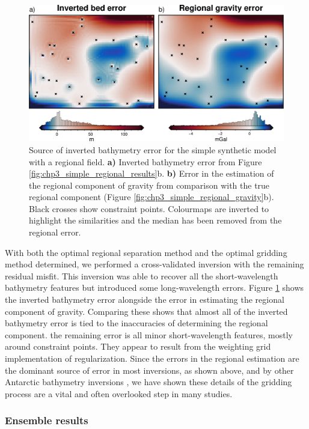 \begin{figure}[!ht]
    \centering
    \includegraphics[width=.7\textwidth]{figures/chp3/chp3_simple_regional_bed_error.png}
    \caption[Synthetic inversion error and regional error]{Source of inverted bathymetry error for the simple synthetic model with a regional field. \textbf{a)} Inverted bathymetry error from Figure \ref{fig:chp3_simple_regional_results}b. \textbf{b)} Error in the estimation of the regional component of gravity from comparison with the true regional component (Figure \ref{fig:chp3_simple_regional_gravity}b). Black crosses show constraint points. Colourmaps are inverted to highlight the similarities and the median has been removed from the regional error.}
    \label{fig:chp3_simple_regional_bed_error}
\end{figure}

With both the optimal regional separation method and the optimal gridding method determined, we performed a cross-validated inversion with the remaining residual misfit. This inversion was able to recover all the short-wavelength bathymetry features but introduced some long-wavelength errors. Figure \ref{fig:chp3_simple_regional_bed_error} shows the inverted bathymetry error alongside the error in estimating the regional component of gravity. Comparing these shows that almost all of the inverted bathymetry error is tied to the inaccuracies of determining the regional component. the remaining error is all minor short-wavelength features, mostly around constraint points. They appear to result from the weighting grid implementation of regularization. Since the errors in the regional estimation are the dominant source of error in most inversions, as shown above, and by other Antarctic bathymetry inversions \citep{brisbourneseabed2014}, we have shown these details of the gridding process are a vital and often overlooked step in many studies. 

\subsubsection{Ensemble results}

